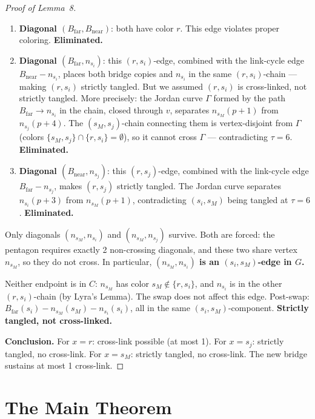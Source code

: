 \documentclass[11pt]{article}
\theoremstyle{remark}
\begin{document}
\begin{proof}[Proof of Lemma~8]
\begin{enumerate}[label=\arabic*.]
  \item \textbf{Diagonal $(B_{\mathrm{far}}, B_{\mathrm{near}})$}: both have color $r$. This edge violates proper coloring. \textbf{Eliminated.}

  \item \textbf{Diagonal $(B_{\mathrm{far}}, n_{s_i})$}: this $(r, s_i)$-edge, combined with the link-cycle edge $B_{\mathrm{near}} - n_{s_i}$, places both bridge copies and $n_{s_i}$ in the same $(r, s_i)$-chain --- making $(r, s_i)$ strictly tangled. But we assumed $(r, s_i)$ is cross-linked, not strictly tangled. More precisely: the Jordan curve $\Gamma$ formed by the path $B_{\mathrm{far}} \to n_{s_i}$ in the chain, closed through $v$, separates $n_{s_M}(p{+}1)$ from $n_{s_j}(p{+}4)$. The $(s_M, s_j)$-chain connecting them is vertex-disjoint from $\Gamma$ (colors $\{s_M, s_j\} \cap \{r, s_i\} = \emptyset$), so it cannot cross $\Gamma$ --- contradicting $\tau = 6$. \textbf{Eliminated.}

  \item \textbf{Diagonal $(B_{\mathrm{near}}, n_{s_j})$}: this $(r, s_j)$-edge, combined with the link-cycle edge $B_{\mathrm{far}} - n_{s_j}$, makes $(r, s_j)$ strictly tangled. The Jordan curve separates $n_{s_i}(p{+}3)$ from $n_{s_M}(p{+}1)$, contradicting $(s_i, s_M)$ being tangled at $\tau = 6$. \textbf{Eliminated.}
\end{enumerate}

Only diagonals $(n_{s_M}, n_{s_i})$ and $(n_{s_M}, n_{s_j})$ survive. Both are forced: the pentagon requires exactly 2 non-crossing diagonals, and these two share vertex $n_{s_M}$, so they do not cross. In particular, \textbf{$(n_{s_M}, n_{s_i})$ is an $(s_i, s_M)$-edge in $G$.}

Neither endpoint is in $C$: $n_{s_M}$ has color $s_M \notin \{r, s_i\}$, and $n_{s_i}$ is in the other $(r, s_i)$-chain (by Lyra's Lemma). The swap does not affect this edge. Post-swap: $B_{\mathrm{far}}(s_i) - n_{s_M}(s_M) - n_{s_i}(s_i)$, all in the same $(s_i, s_M)$-component. \textbf{Strictly tangled, not cross-linked.}

\medskip
\noindent\textbf{Conclusion.} For $x = r$: cross-link possible (at most 1). For $x = s_j$: strictly tangled, no cross-link. For $x = s_M$: strictly tangled, no cross-link. The new bridge sustains at most 1 cross-link.
\end{proof}

\section{The Main Theorem}
\end{document}
